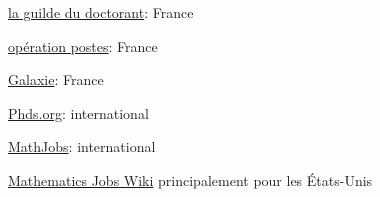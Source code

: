 

\href{http://guilde.jeunes-chercheurs.org/}{la guilde du doctorant}: France

\href{http://postes.smai.emath.fr/}{opération postes}: France

\href{https://www.galaxie.enseignementsup-recherche.gouv.fr/ensup/candidats.html}{Galaxie}: France

\href{http://www.phds.org/}{Phds.org}: international

\href{https://www.mathjobs.org/jobs}{MathJobs}: international

\href{http://notable.math.ucdavis.edu/wiki/Mathematics_Jobs_Wiki}{Mathematics Jobs Wiki} principalement
pour les \'Etats-Unis